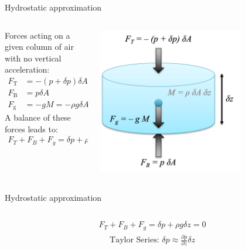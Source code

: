 \documentclass[aspectratio=169,xcolor=dvipsnames]{beamer}
\begin{document}
{\begin{frame}{Hydrostatic approximation}
\begin{columns}
\begin{column}{0.5\textwidth}
Forces acting on a given column of air with no vertical acceleration:
   \begin{align*}
       F_\mathrm{T} & =  -\left(p + \delta p \right)\delta A \\
       F_\mathrm{B} & =  p\delta A \\
       F_\mathrm{g} & = -g M = -\rho g \delta A \delta z
   \end{align*}
   A balance of these forces leads to:
   \begin{align*}
       F_T + F_B + F_g = \delta p + \rho g\delta z = 0
   \end{align*}
\end{column}
\begin{column}{0.5\textwidth}
    \begin{center}
    \includegraphics[width=0.7\textwidth]{figs/Fig-Pressure-on-cylinder-ajr.png}
     \end{center}
\end{column}
\end{columns}

\end{frame}

\begin{frame}{Hydrostatic approximation}

\begin{columns}
\begin{column}{0.5\textwidth}
   \begin{align*}
       F_T + F_B + F_g = \delta p + \rho g\delta z = 0
   \end{align*}
   \begin{align*}
       \text{Taylor Series: }\delta p \approx \frac{\partial p}{\partial z}\delta z
   \end{align*}


\end{column}
\end{columns}
\end{frame}}
\end{document}
